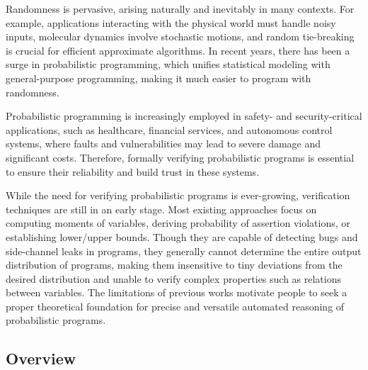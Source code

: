\documentclass[a4paper]{article}
\begin{document}
Randomness is pervasive, arising naturally and inevitably in many contexts.
For example, applications interacting with the physical world must handle noisy inputs, molecular dynamics involve stochastic motions, and random tie-breaking is crucial for efficient approximate algorithms.
In recent years, there has been a surge in probabilistic programming, which unifies statistical modeling with general-purpose programming, making it much easier to program with randomness.
\par
Probabilistic programming is increasingly employed in safety- and security-critical applications, such as healthcare, financial services, and autonomous control systems,
where faults and vulnerabilities may lead to severe damage and significant costs. Therefore, formally verifying probabilistic programs is essential to ensure their reliability and build trust in these systems.
\par
While the need for verifying probabilistic programs is ever-growing, verification techniques are still in an early stage.
Most existing approaches focus on computing moments of variables\cite{wang2021central}, deriving probability of assertion violations\cite{assert}, or establishing lower/upper bounds\cite{probana}.
Though they are capable of detecting bugs and side-channel leaks in programs, they generally cannot determine the entire output distribution of programs,
making them insensitive to tiny deviations from the desired distribution and unable to verify complex properties such as relations between variables.
The limitations of previous works motivate people to seek a proper theoretical foundation for precise and versatile automated reasoning of probabilistic programs.

\subsection{Overview}
\end{document}
